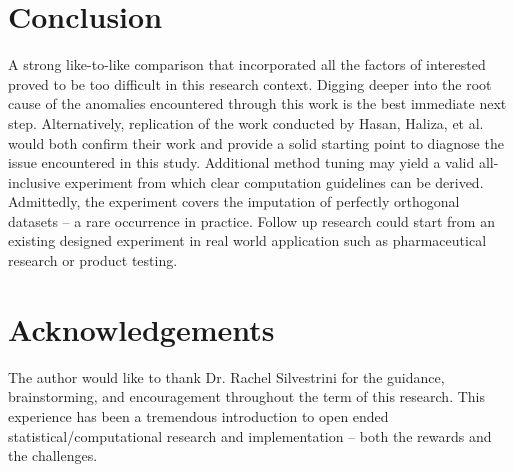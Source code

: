 \documentclass[../paper.tex]{subfiles}
\begin{document}
\section{Conclusion}

A strong like-to-like comparison that incorporated all the factors of interested proved to be too difficult in this research context.
Digging deeper into the root cause of the anomalies encountered through this work is the best immediate next step.
Alternatively, replication of the work conducted by Hasan, Haliza, et al. would both confirm their work and provide a solid starting point to diagnose the issue encountered in this study.
Additional method tuning may yield a valid all-inclusive experiment from which clear computation guidelines can be derived.
Admittedly, the experiment covers the imputation of perfectly orthogonal datasets -- a rare occurrence in practice.
Follow up research could start from an existing designed experiment in real world application such as pharmaceutical research or product testing.

\section{Acknowledgements}
The author would like to thank Dr. Rachel Silvestrini for the guidance, brainstorming, and encouragement throughout the term of this research. This experience has been a tremendous introduction to open ended statistical/computational research and implementation -- both the rewards and the challenges.
\end{document}
